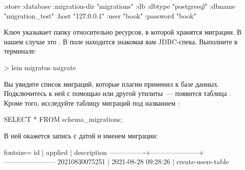 \begin{english}
  \begin{clojure}
{:store :database
 :migration-dir "migrations"
 :db {:dbtype "postgresql"
      :dbname "migration_test"
      :host "127.0.0.1"
      :user "book"
      :password "book"}}
  \end{clojure}
\end{english}

Ключ  указывает папку относительно ресурсов, в которой хранятся миграции. В нашем случае это . В поле  находится знакомая вам JDBC-спека. Выполните в терминале:

\begin{english}
  \begin{bash}
> lein migratus migrate
  \end{bash}
\end{english}

Вы увидите список миграций, которые плагин применил к базе данных. Подключитесь к ней с помощью  или другой утилиты~--- появится таблица . Кроме того, исследуйте таблицу миграций под названием :

\begin{english}
  \begin{clojure}
SELECT * FROM schema_migrations;
  \end{clojure}
\end{english}

В ней окажется запись с датой и именем миграции:


\begin{english}
  \begin{text*}{fontsize=\small}
         id     |       applied       |      description
----------------+---------------------+-----------------------
 20210830075251 | 2021-08-28 09:28:26 | create-users-table
  \end{text*}
\end{english}

